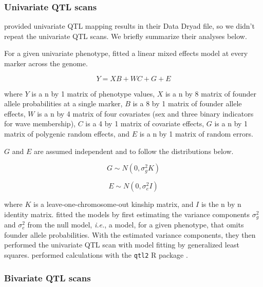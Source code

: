 \documentclass{article}
\begin{document}
\subsubsection{Univariate QTL scans}

\citet{keller2018genetic} provided univariate QTL mapping results in their Data Dryad file, so we didn't repeat the univariate QTL scans. We briefly summarize their analyses below.

For a given univariate phenotype, \citet{keller2018genetic} fitted a linear mixed effects model at every marker across the genome.

\begin{equation}
    Y = XB + WC + G + E
    \label{eqn:uni-lmm}
\end{equation}

where $Y$ is a n by 1 matrix of phenotype values, $X$ is a n by 8 matrix of founder allele probabilities at a single marker, $B$ is a 8 by 1 matrix of founder allele effects, $W$ is a n by 4 matrix of four covariates (sex and three binary indicators for wave membership), $C$ is a 4 by 1 matrix of covariate effects, $G$ is a n by 1 matrix of polygenic random effects, and $E$ is a n by 1 matrix of random errors.

$G$ and $E$ are assumed independent and to follow the distributions below.

\begin{equation}
    G \sim N(0, \sigma^2_gK)
\end{equation}

\begin{equation}
    E \sim N(0, \sigma^2_eI)
\end{equation}

where $K$ is a leave-one-chromosome-out kinship matrix, and $I$ is the n by n identity matrix. \citet{keller2018genetic} fitted the models by first estimating the variance components $\sigma^2_g$ and $\sigma^2_e$ from the null model, \emph{i.e.}, a model, for a given phenotype, that omits founder allele probabilities. With the estimated variance components, they then performed the univariate QTL scan with model fitting by generalized least squares. \citet{keller2018genetic} performed calculations with the \texttt{qtl2} R package \citep{Broman2018}.



\subsubsection{Bivariate QTL scans}
\end{document}
